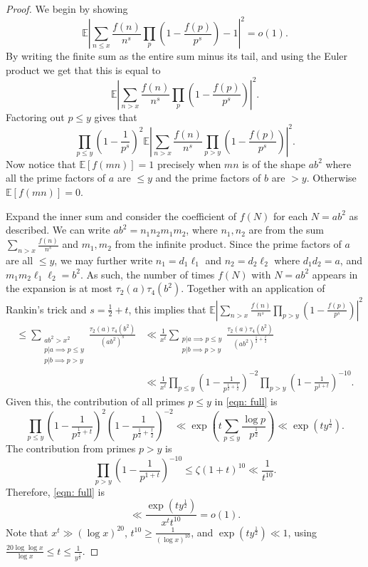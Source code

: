 \documentclass[10pt,a4paper]{amsart}
\def\E{\mathbb E}
\begin{document}
\begin{proof}
We begin by showing
$$
\mathbb{E} \left| \sum_{n \leq x} \frac{f(n)}{n^s}  \prod_p \left( 1 - \frac{f(p)}{p^s} \right) -1\right|^2 =o(1).
$$
By writing the finite sum as the entire sum minus its tail, and using the Euler product we get that this is equal to
$$\mathbb{E} \left| \sum_{n > x} \frac{f(n)}{n^s}  \prod_{p} \left( 1 - \frac{f(p)}{p^s} \right) \right|^2.$$ 
    Factoring out $p \le y$ gives that
\begin{equation}\label{eqn: full}
    \prod_{p \le y} \left(1  - \frac{1}{p^s}\right)^2\mathbb{E} \left| \sum_{n > x} \frac{f(n)}{n^s}  \prod_{p>y} \left( 1 - \frac{f(p)}{p^s} \right) \right|^2.    
    \end{equation}
Now notice that $\E[f(mn)]=1$ precisely when $mn$ is of the shape $ab^2$ where all the prime factors of $a$ are $\le y$ and the prime factors of $b$ are $>y$. Otherwise $\E[f(mn)] = 0$.
    
    Expand the inner sum and consider the coefficient of $f(N)$ for each $N = ab^2$ as described. We can write $ab^2=n_1n_2m_1m_2$, where $n_1,n_2$ are from the sum $\sum_{n>x}\frac{f(n)}{n^{s}}$ and $m_1,m_2$ from the infinite product. Since the prime factors of $a$ are all $\le y$, we may further write $n_1=d_1\ell_1$ and $n_2=d_2\ell_2$ where $d_1d_2=a$, and $m_1m_2\ell_1\ell_2=b^2$. As such, the number of times $f(N)$ with $N=ab^2$ appears in the expansion is at most $\tau_2(a)\tau_4(b^2)$.
Together with an application of Rankin's trick and $s = \frac{1}{2}+t$, this implies that  $\mathbb{E} \left| \sum_{n > x} \frac{f(n)}{n^s}  \prod_{p>y} \left( 1 - \frac{f(p)}{p^s} \right) \right|^2$
\begin{equation*}
    \begin{split}
    \le \sum_{\substack{ab^2>x^2 \\ p|a \implies p\le y\\ p|b \implies p>y}} \frac{\tau_2(a)\tau_4(b^2)}{(ab^2)^s} &\ll \frac{1}{x^t}\sum_{\substack{p|a \implies p\le y\\ p|b \implies p>y}} \frac{\tau_2(a)\tau_4(b^2)}{(ab^2)^{\frac{1}{2}+\frac{t}{2}}} \\ & \ll \frac{1}{x^t}\prod_{p \le y} \left(1-\frac{1}{p^{\frac{1}{2}+\frac{t}{2}}}\right)^{-2} \prod_{p>y} \left(1-\frac{1}{p^{1+t}}\right)^{-10}.     
    \end{split}
\end{equation*}
    Given this, the contribution of all primes $p \le y$ in \eqref{eqn: full} is 
    $$\prod_{p \le y} \left(1  - \frac{1}{p^{\frac{1}{2}+t}}\right)^2\left(1-\frac{1}{p^{\frac{1}{2}+\frac{t}{2}}}\right)^{-2} \ll \exp \left(t\sum_{p \le y} \frac{\log p}{p^{\frac{1}{2}}}\right) \ll \exp(t y^{\frac{1}{2}}).$$
 The contribution from primes $p>y$ is 
    $$\prod_{p>y} \left(1-\frac{1}{p^{1+t}}\right)^{-10} \le \zeta(1+t)^{10} \ll \frac{1}{t ^{10}}.$$
    Therefore, \eqref{eqn: full} is 
    $$\ll \frac{\exp(ty^{\frac{1}{2}})}{x^{t}t^{10}}=o(1).$$
    Note that $x^{t} \gg (\log x)^{20}$, $t^{10} \ge \frac{1}{(\log x)^{10}}$, and $\exp(ty^{\frac{1}{2}}) \ll 1$,  using $\frac{20\log \log x}{\log x}\le t \le \frac{1}{y^{\frac{1}{2}}}$.


\end{proof}
\end{document}
